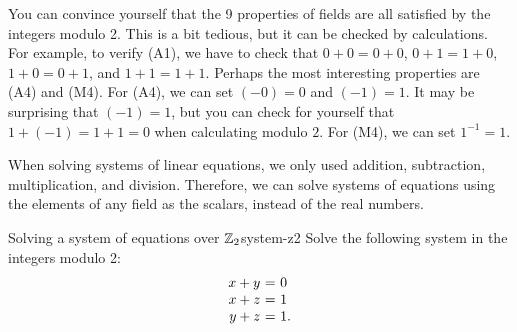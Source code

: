 You can convince yourself that the 9 properties of fields are all
satisfied by the integers modulo 2. This is a bit tedious, but it can
be checked by calculations.  For example, to verify (A1), we have to
check that $0+0=0+0$, $0+1=1+0$, $1+0=0+1$, and $1+1=1+1$. Perhaps the
most interesting properties are (A4) and (M4). For (A4), we can set
$(-0)=0$ and $(-1)=1$. It may be surprising that $(-1)=1$, but you can
check for yourself that $1+(-1)=1+1=0$ when calculating modulo
$2$. For (M4), we can set $1^{-1} = 1$.

When solving systems of linear equations, we only used addition,
subtraction, multiplication, and division. Therefore, we can solve
systems of equations using the elements of any field as the scalars,
instead of the real numbers.

\begin{example}{Solving a system of equations over $\mathbb{Z}_2$}{system-z2}
  Solve the following system in the integers modulo 2:
  \begin{equation*}
    \begin{array}{r@{~}c@{~}l}
      x + y     &=& 0 \\
      x     + z &=& 1 \\
          y + z &=& 1.
    \end{array}
  \end{equation*}
\end{example}

